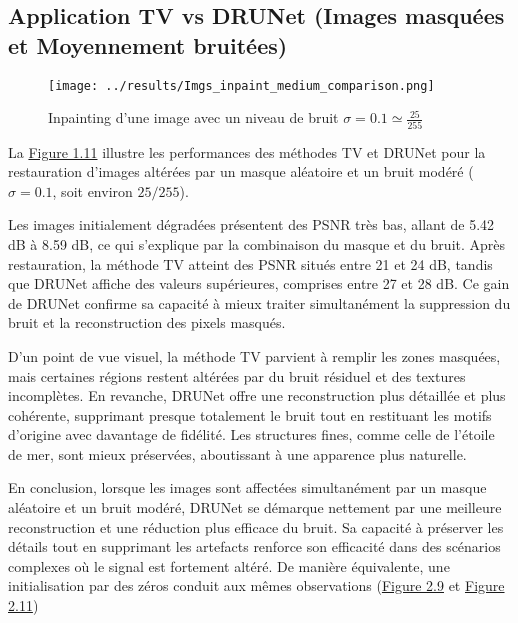 \documentclass[a4paper, 12pt]{report} %
\begin{document}
\subsection{Application TV vs DRUNet (Images masquées et Moyennement bruitées)}


\begin{figure}[H]
\centering
\begin{adjustbox}{width=0.985\linewidth, totalheight=0.47 \textheight, angle=0, scale= 0.9, minipage= 4.2\linewidth, margin= 0}
    \texttt{[image: ../results/Imgs\_inpaint\_medium\_comparison.png]}
\end{adjustbox}
    \caption{Inpainting d'une image avec un niveau de bruit $\sigma = 0.1 \simeq \frac{25}{255}$}
    \label{fig:11}
\end{figure}

La \hyperref[fig:11]{Figure 1.11} illustre les performances des méthodes TV et DRUNet pour la restauration d’images altérées par un masque aléatoire et un bruit modéré (\(\sigma = 0.1\), soit environ \(25/255\)).

Les images initialement dégradées présentent des PSNR très bas, allant de 5.42 dB à 8.59 dB, ce qui s'explique par la combinaison du masque et du bruit. Après restauration, la méthode TV atteint des PSNR situés entre 21 et 24 dB, tandis que DRUNet affiche des valeurs supérieures, comprises entre 27 et 28 dB. Ce gain de DRUNet confirme sa capacité à mieux traiter simultanément la suppression du bruit et la reconstruction des pixels masqués.

D'un point de vue visuel, la méthode TV parvient à remplir les zones masquées, mais certaines régions restent altérées par du bruit résiduel et des textures incomplètes. En revanche, DRUNet offre une reconstruction plus détaillée et plus cohérente, supprimant presque totalement le bruit tout en restituant les motifs d'origine avec davantage de fidélité. Les structures fines, comme celle de l’étoile de mer, sont mieux préservées, aboutissant à une apparence plus naturelle.

En conclusion, lorsque les images sont affectées simultanément par un masque aléatoire et un bruit modéré, DRUNet se démarque nettement par une meilleure reconstruction et une réduction plus efficace du bruit. Sa capacité à préserver les détails tout en supprimant les artefacts renforce son efficacité dans des scénarios complexes où le signal est fortement altéré. De manière équivalente, une initialisation par des zéros conduit aux mêmes observations (\hyperref[fig:20]{Figure 2.9} et \hyperref[fig:22]{Figure 2.11})
\end{document}
